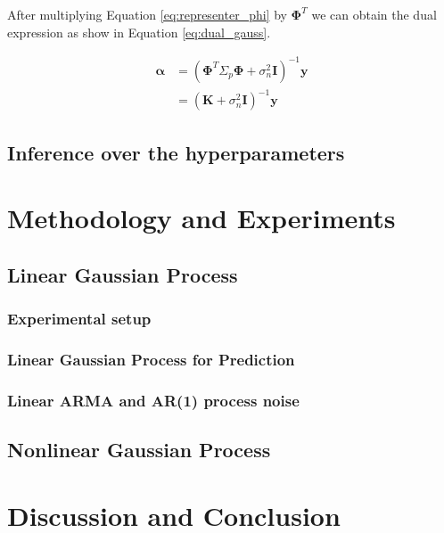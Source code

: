 \documentclass[11pt, twoside]{article}   	%
\begin{document}
After multiplying Equation \ref{eq:representer_phi} by $\mathbf{\Phi}^T$ we can obtain the dual 
expression as show in Equation \ref{eq:dual_gauss}.

\begin{align}
\mathbf{\alpha} &= (\mathbf{\Phi}^T \Sigma_p \mathbf{\Phi} + \sigma^2_n \mathbf{I})^{-1} \mathbf{y}\\
&= (\mathbf{K} + \sigma^2_n \mathbf{I})^{-1} \mathbf{y}
\label{eq:dual_guass}
\end{align}

\subsection{Inference over the hyperparameters}

\section{Methodology and Experiments}
\subsection{Linear Gaussian Process}
\subsubsection{Experimental setup}
\subsubsection{Linear Gaussian Process for Prediction}
\subsubsection{Linear ARMA and AR(1) process noise}
\subsection{Nonlinear Gaussian Process}

\section{Discussion and Conclusion}



\end{document}
